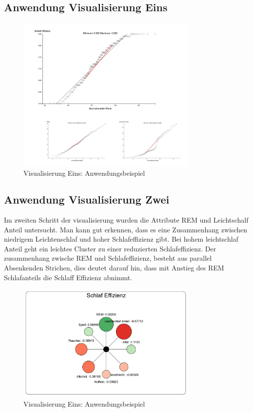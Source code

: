 \documentclass[usegeometry=true]{scrartcl}
\begin{document}
\subsection{Anwendung Visualisierung Eins}

\begin{figure}[h]
  \centering
  \includegraphics[width = 0.8\textwidth]{Bsp_QQ-Plot.JPG}
  \caption{Visualisierung Eins: Anwendungsbeispiel}
\end{figure}

\subsection{Anwendung Visualisierung Zwei}

Im zweiten Schritt der visualisierung wurden die Attribute REM und Leichtschalf Anteil untersucht. Man kann gut erkennen, dass es eine Zusammenhang zwischen niedrigem Leichtenschlaf und hoher Schlafeffizienz gibt. Bei hohem leichtschlaf Anteil geht ein leichtes Cluster zu einer reduzierten Schlafeffizienz. 
Der zusammenhang zwische REM und Schlafeffizienz, besteht aus parallel Absenkenden Strichen, dies deutet darauf hin, dass mit Anstieg des REM Schlafanteils die Schlaff Effizienz abnimmt.

\begin{figure}[h]

  \centering
  \includegraphics [width = 0.8\textwidth]{Bsp_ImpactGraph.JPG}
  \caption{Visualisierung Eins: Anwendungsbeispiel}

  
\end{figure}
\end{document}
